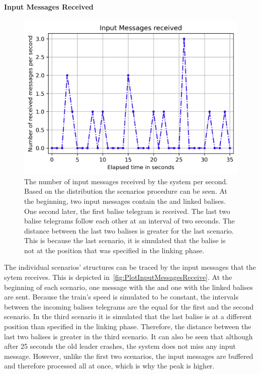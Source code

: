 \paragraph{Input Messages Received}

\begin{figure}[!hb]
	\centering
	\includegraphics[width=0.75\linewidth]{images/plots/InputMessagesReceive}
	\caption{The number of input messages received by the system per second. Based on the distribution the scenarios procedure can be seen. At the beginning, two input messages contain the  and linked balises. One second later, the first balise telegram is received. The last two balise telegrams follow each other at an interval of two seconds. The distance between the last two balises is greater for the last scenario. This is because the last scenario, it is simulated that the balise is not at the position that was specified in the linking phase.}
	\label{fig:PlotInputMessagesReceive}
\end{figure}

The individual scenarios' structures can be traced by the input messages that the sytem receives.
This is depicted in~\autoref{fig:PlotInputMessagesReceive}.
At the beginning of each scenario, one message with the  and one with the linked balises are sent.
Because the train's speed is simulated to be constant, the intervals between the incoming balises telegrams are the equal for the first and the second scenario.
In the third scenario it is simulated that the last balise is at a different position than specified in the linking phase.
Therefore, the distance between the last two balises is greater in the third scenario.
It can also be seen that although after 25 seconds the old leader crashes, the system does not miss any input message.
However, unlike the first two scenarios, the input messages are buffered and therefore processed all at once, which is why the peak is higher.

